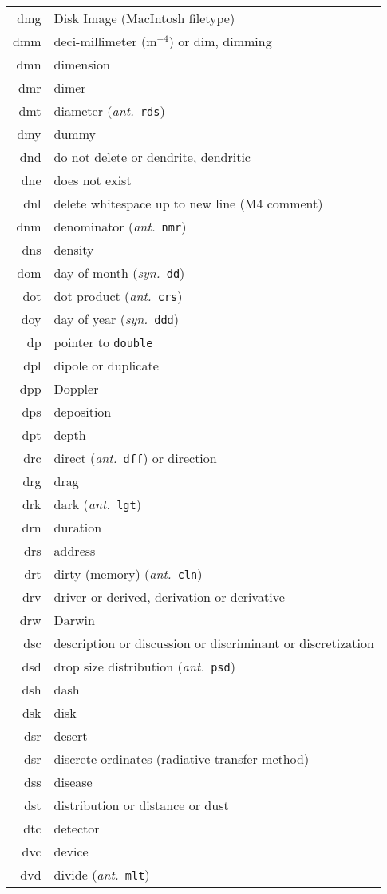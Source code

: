 \documentclass[12pt,twoside]{article}
\newcommand{\ant}[1]{(\textit{ant.}~\texttt{#1})}
\newcommand{\syn}[1]{(\textit{syn.}~\texttt{#1})}
\begin{document}
\begin{longtable}[>{\bfseries}l]{>{\ttfamily}r l}
dmg & Disk Image (MacIntosh filetype) \\
dmm & deci-millimeter (m$^{-4}$) or dim, dimming \\
dmn & dimension \\
dmr & dimer \\
dmt & diameter \ant{rds} \\
dmy & dummy \\
dnd & do not delete or dendrite, dendritic \\
dne & does not exist \\
dnl & delete whitespace up to new line (M4 comment) \\ 
dnm & denominator \ant{nmr} \\
dns & density \\
dom & day of month \syn{dd} \\
dot & dot product \ant{crs} \\
doy & day of year \syn{ddd} \\
dp & pointer to \texttt{double} \\
dpl & dipole or duplicate \\
dpp & Doppler \\
dps & deposition \\
dpt & depth \\
drc & direct \ant{dff} or direction \\
drg & drag \\
drk & dark \ant{lgt} \\
drn & duration \\
drs & address \\
drt & dirty (memory) \ant{cln} \\
drv & driver or derived, derivation or derivative \\
drw & Darwin \\
dsc & description or discussion or discriminant or discretization \\
dsd & drop size distribution \ant{psd} \\
dsh & dash \\
dsk & disk \\
dsr & desert \\
dsr & discrete-ordinates (radiative transfer method) \\
dss & disease \\
dst & distribution or distance or dust \\
dtc & detector \\
dvc & device \\
dvd & divide \ant{mlt} \\

\end{longtable}
\end{document}
